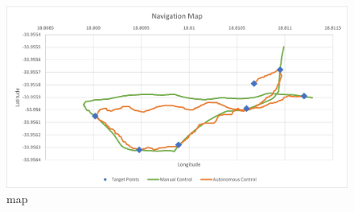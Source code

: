 \begin{figure}
	\begin{center}
		\includegraphics[width = 0.8\linewidth]{figures/graphMap.jpg}
		\caption{map}
		\label{graph:4:Map}
	\end{center}
\end{figure}